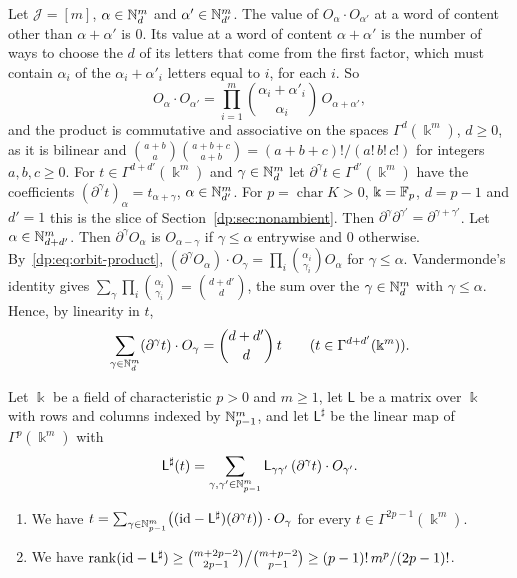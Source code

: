 Let $\mathcal J=[m]$, $\alpha\in\mathbb N^m_d$ and $\alpha'\in\mathbb N^m_{d'}$. The value of $O_\alpha\cdot O_{\alpha'}$ at a word of content other than $\alpha+\alpha'$ is $0$. Its value at a word of content $\alpha+\alpha'$ is the number of ways to choose the $d$ of its letters that come from the first factor, which must contain $\alpha_i$ of the $\alpha_i+\alpha'_i$ letters equal to $i$, for each $i$. So
\begin{equation}\label{dp:eq:orbit-product}
 O_\alpha\cdot O_{\alpha'}=\prod_{i=1}^m\binom{\alpha_i+\alpha'_i}{\alpha_i}\,O_{\alpha+\alpha'},
\end{equation}
and the product is commutative and associative on the spaces $\Gamma^d(\Bbbk^m)$, $d\ge0$, as it is bilinear and $\binom{a+b}a\binom{a+b+c}{a+b}=(a+b+c)!/(a!\,b!\,c!)$ for integers $a,b,c\ge0$. For $t\in\Gamma^{d+d'}(\Bbbk^m)$ and $\gamma\in\mathbb N^m_d$ let $\partial^\gamma t\in\Gamma^{d'}(\Bbbk^m)$ have the coefficients $(\partial^\gamma t)_\alpha=t_{\alpha+\gamma}$, $\alpha\in\mathbb N^m_{d'}$. For $p=\operatorname{char}K>0$, $\Bbbk=\mathbb F_p$, $d=p-1$ and $d'=1$ this is the slice of Section~\ref{dp:sec:nonambient}. Then $\partial^\gamma\partial^{\gamma'}=\partial^{\gamma+\gamma'}$. Let $\alpha\in\mathbb N^m_{d+d'}$. Then $\partial^\gamma O_\alpha$ is $O_{\alpha-\gamma}$ if $\gamma\le\alpha$ entrywise and $0$ otherwise. By~\eqref{dp:eq:orbit-product}, $(\partial^\gamma O_\alpha)\cdot O_\gamma=\prod_i\binom{\alpha_i}{\gamma_i}O_\alpha$ for $\gamma\le\alpha$. Vandermonde's identity gives $\sum_\gamma\prod_i\binom{\alpha_i}{\gamma_i}=\binom{d+d'}d$, the sum over the $\gamma\in\mathbb N^m_d$ with $\gamma\le\alpha$. Hence, by linearity in $t$,
\begin{equation}\label{dp:eq:contraction-sum}
 \sum_{\gamma\in\mathbb N^m_d}(\partial^\gamma t)\cdot O_\gamma=\binom{d+d'}d\,t\qquad(t\in\Gamma^{d+d'}(\Bbbk^m)).
\end{equation}

\begin{lemma}\label{dp:lem:linear}
Let $\Bbbk$ be a field of characteristic $p>0$ and $m\ge1$, let $\mathsf L$ be a matrix over $\Bbbk$ with rows and columns indexed by $\mathbb N^m_{p-1}$, and let $\mathsf L^\sharp$ be the linear map of $\Gamma^p(\Bbbk^m)$ with
\[
 \mathsf L^\sharp(t)=\sum_{\gamma,\gamma'\in\mathbb N^m_{p-1}}\mathsf L_{\gamma\gamma'}\,(\partial^\gamma t)\cdot O_{\gamma'}.
\]
\begin{enumerate}
\item We have $t=\sum_{\gamma\in\mathbb N^m_{p-1}}\bigl((\mathrm{id}-\mathsf L^\sharp)(\partial^\gamma t)\bigr)\cdot O_\gamma$ for every $t\in\Gamma^{2p-1}(\Bbbk^m)$.
\item We have $\operatorname{rank}(\mathrm{id}-\mathsf L^\sharp)\ge\binom{m+2p-2}{2p-1}\big/\binom{m+p-2}{p-1}\ge(p-1)!\,m^p/(2p-1)!$.
\end{enumerate}
\end{lemma}

